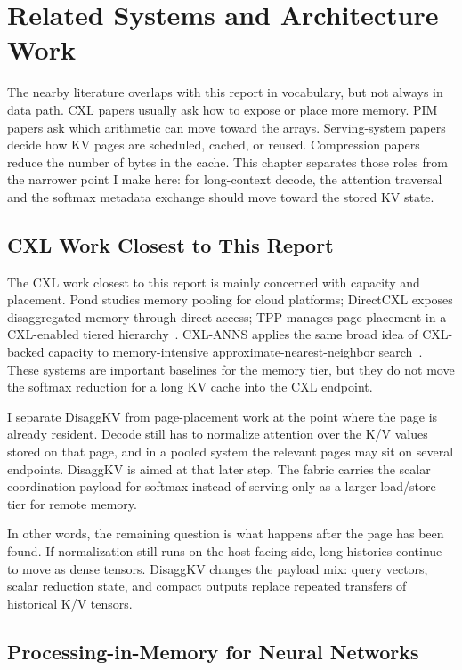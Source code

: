 \chapter{Related Systems and Architecture Work}
\label{ch:related_work}

The nearby literature overlaps with this report in vocabulary, but not always in data path. CXL papers usually ask how to expose or place more memory. PIM papers ask which arithmetic can move toward the arrays. Serving-system papers decide how KV pages are scheduled, cached, or reused. Compression papers reduce the number of bytes in the cache. This chapter separates those roles from the narrower point I make here: for long-context decode, the attention traversal and the softmax metadata exchange should move toward the stored KV state.

\section{CXL Work Closest to This Report}

The CXL work closest to this report is mainly concerned with capacity and placement. Pond studies memory pooling for cloud platforms; DirectCXL exposes disaggregated memory through direct access; TPP manages page placement in a CXL-enabled tiered hierarchy~\cite{cxl_pond, direct_cxl, tpp}. CXL-ANNS applies the same broad idea of CXL-backed capacity to memory-intensive approximate-nearest-neighbor search~\cite{cxl_anns}. These systems are important baselines for the memory tier, but they do not move the softmax reduction for a long KV cache into the CXL endpoint.

I separate DisaggKV from page-placement work at the point where the page is already resident. Decode still has to normalize attention over the K/V values stored on that page, and in a pooled system the relevant pages may sit on several endpoints. DisaggKV is aimed at that later step. The fabric carries the scalar coordination payload for softmax instead of serving only as a larger load/store tier for remote memory.

In other words, the remaining question is what happens after the page has been found. If normalization still runs on the host-facing side, long histories continue to move as dense tensors. DisaggKV changes the payload mix: query vectors, scalar reduction state, and compact outputs replace repeated transfers of historical K/V tensors.

\section{Processing-in-Memory for Neural Networks}

